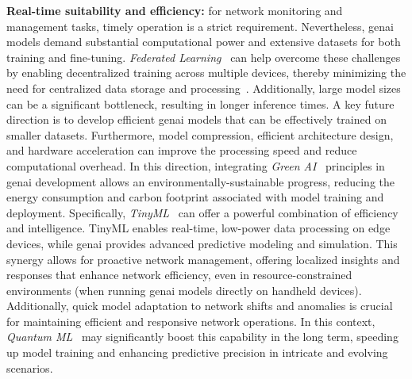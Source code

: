\noindent
\textbf{Real-time suitability and efficiency:}
%
for network monitoring and management tasks, timely operation is a strict requirement.
%
Nevertheless, \gls{genai} models demand substantial computational power and extensive datasets for both training and fine-tuning. 
%
\emph{Federated Learning}~\cite{zhang2021survey, li2020review} can help overcome these challenges by enabling decentralized training across multiple devices, thereby minimizing the need for centralized data storage and processing~\cite{huang2024federated}.
%
Additionally, large model sizes can be a significant bottleneck, resulting in longer inference times.
A key future direction is to develop efficient \gls{genai} models that can be effectively trained on smaller datasets.
Furthermore, model compression, efficient architecture design, and hardware acceleration can improve the processing speed and reduce computational overhead.
In this direction, integrating \emph{Green AI}~\cite{schwartz2020green} principles in \gls{genai} development allows
an environmentally-sustainable progress,
reducing the energy consumption and carbon footprint associated with model training and deployment.
Specifically, 
\emph{TinyML}~\cite{ray2022review, dutta2021tinyml} can offer a powerful combination of efficiency and intelligence. 
TinyML enables real-time, low-power data processing on edge devices, while \gls{genai} provides advanced predictive modeling and simulation.
This synergy allows for proactive network management, offering localized insights and responses that enhance network efficiency, even in resource-constrained environments (\eg when running \gls{genai} models directly on handheld devices).
Additionally, 
quick model adaptation to network shifts and anomalies
is crucial for maintaining efficient and responsive network operations.
In this context, \emph{Quantum ML}~\cite{ciliberto2018quantum, dunjko2018machine} may significantly boost this capability in the long term, speeding up model training and enhancing predictive precision in intricate and evolving scenarios.

